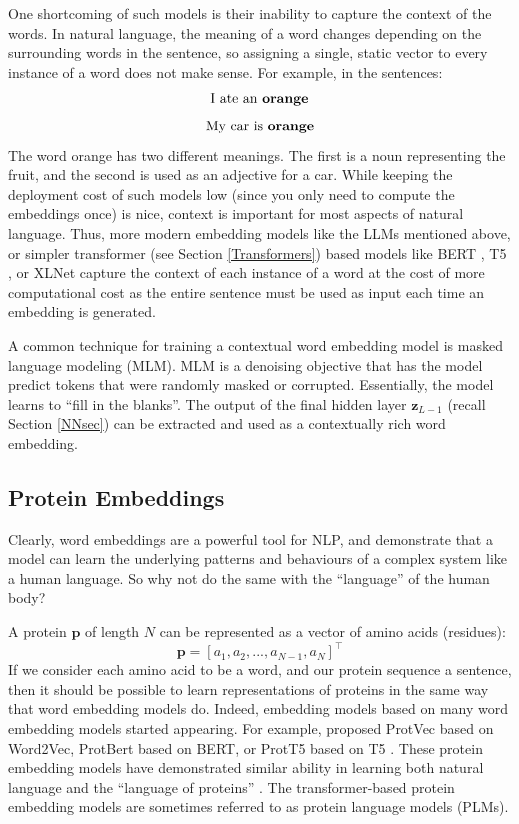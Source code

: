 \documentclass{article}
\begin{document}
One shortcoming of such models is their inability to capture the context of the words. In natural language, the meaning of a word changes depending on the surrounding words in the sentence, so assigning a single, static vector to every instance of a word does not make sense. For example, in the sentences:
\[\text{I ate an \textbf{orange}}\]
\[\text{My car is \textbf{orange}}\]
The word orange has two different meanings. The first is a noun representing the fruit, and the second is used as an adjective for a car. While keeping the deployment cost of such models low (since you only need to compute the embeddings once) is nice, context is important for most aspects of natural language. Thus, more modern embedding models like the LLMs mentioned above, or simpler transformer (see Section \ref{Transformers}) based models like BERT \citep{bert}, T5 \citep{raffel_exploring_2020}, or XLNet \citep{yang_xlnet_2019} capture the context of each instance of a word at the cost of more computational cost as the entire sentence must be used as input each time an embedding is generated. 

A common technique for training a contextual word embedding model is masked language modeling (MLM). MLM is a denoising objective that has the model predict tokens that were randomly masked or corrupted. Essentially, the model learns to ``fill in the blanks''. The output of the final hidden layer \(\mathbf{z}_{L-1}\) (recall Section \ref{NNsec}) can be extracted and used as a contextually rich word embedding.

\subsection{Protein Embeddings}
Clearly, word embeddings are a powerful tool for NLP, and demonstrate that a model can learn the underlying patterns and behaviours of a complex system like a human language. So why not do the same with the ``language'' of the human body?

A protein \(\mathbf{p}\) of length \(N\) can be represented as a vector of amino acids (residues):
\[\mathbf{p} = [a_1, a_2, ..., a_{N-1}, a_N]^\intercal\]
If we consider each amino acid to be a word, and our protein sequence a sentence, then it should be possible to learn representations of proteins in the same way that word embedding models do. Indeed, embedding models based on many word embedding models started appearing. For example, \citet{asgari_continuous_2015} proposed ProtVec based on Word2Vec, ProtBert \citep{brandes_proteinbert_2022} based on BERT, or ProtT5 \citep{elnaggar_prottrans_2022} based on T5 \citep{raffel_exploring_2020}. These protein embedding models have demonstrated similar ability in learning both natural language and the ``language of proteins'' \citep{tran_survey_2023}. The transformer-based protein embedding models are sometimes referred to as protein language models (PLMs).
\end{document}
